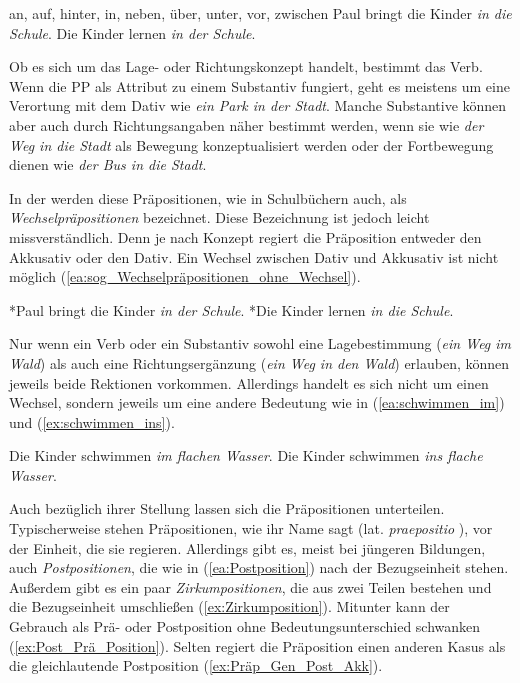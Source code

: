\ea \label{ea:sog_Wechselpräpositionen}
\ea \label{ea:sog_WechselPräp_Liste} an, auf, hinter, in, neben, über, unter, vor, zwischen
\ex \label{ex:sog_WechselPräp_A} Paul bringt die Kinder \textit{in die Schule}.
\ex \label{ex:sog_WechselPräp_D} Die Kinder lernen \textit{in der Schule}.
\z 
\z 

Ob es sich um das Lage- oder Richtungskonzept handelt, bestimmt das Verb. Wenn die PP als Attribut zu einem Substantiv fungiert, geht es meistens um eine Verortung mit dem Dativ wie \textit{ein Park in der Stadt}. Manche Substantive können aber auch durch Richtungsangaben näher bestimmt werden, \zB wenn sie wie \textit{der Weg in die Stadt} als Bewegung konzeptualisiert werden oder der Fortbewegung dienen wie \textit{der Bus in die Stadt}.

In der \citet[461, §764]{Duden2022} werden diese Präpositionen, wie in Schulbüchern auch, als \textit{Wechselpräpositionen} bezeichnet. Diese Bezeichnung ist jedoch leicht missverständlich. Denn je nach Konzept regiert die Präposition entweder den Akkusativ oder den Dativ. Ein Wechsel zwischen Dativ und Akkusativ ist nicht möglich (\ref{ea:sog_Wechselpräpositionen_ohne_Wechsel}).

\ea \label{ea:sog_Wechselpräpositionen_ohne_Wechsel}
\ea \label{ea:*Wechsel_A_D} *Paul bringt die Kinder \textit{in der Schule}.
\ex \label{ex:*Wechsel_D_A} *Die Kinder lernen \textit{in die Schule}. 
\z 
\z 

Nur wenn \zB ein Verb oder ein Substantiv sowohl eine Lagebestimmung (\textit{ein Weg im Wald}) als auch eine Richtungsergänzung (\textit{ein Weg in den Wald}) erlauben, können jeweils beide Rektionen vorkommen. Allerdings handelt es sich nicht um einen Wechsel, sondern jeweils um eine andere Bedeutung wie in (\ref{ea:schwimmen_im}) und (\ref{ex:schwimmen_ins}). 

\ea \label{ea:schwimmen_in_ins}
\ea \label{ea:schwimmen_im} Die Kinder schwimmen \textit{im flachen Wasser}.
\ex \label{ex:schwimmen_ins} Die Kinder schwimmen \textit{ins flache Wasser}.
\z 
\z 

Auch bezüglich ihrer Stellung lassen sich die Präpositionen unterteilen. Typischerweise stehen Präpositionen, wie ihr Name sagt (lat. \textit{praepositio} ), vor der Einheit, die sie regieren. Allerdings gibt es, meist bei jüngeren Bildungen, auch \textit{Postpositionen}, die wie in (\ref{ea:Postposition}) nach der Bezugseinheit stehen. Außerdem gibt es ein paar \textit{Zirkumpositionen}, die aus zwei Teilen bestehen und die Bezugseinheit umschließen (\ref{ex:Zirkumposition}). Mitunter kann der Gebrauch als Prä- oder Postposition ohne Bedeutungsunterschied schwanken (\ref{ex:Post_Prä_Position}). Selten regiert die Präposition einen anderen Kasus als die gleichlautende Postposition (\ref{ex:Präp_Gen_Post_Akk}).

